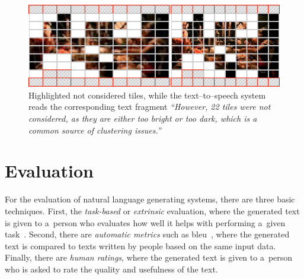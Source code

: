 \documentclass{article}
\begin{document}
\begin{figure}[t!]
  \centering
  \includegraphics[width=0.75\linewidth]{./tile-highlight.png}
  \caption{Highlighted not considered tiles, while the text--to--speech system reads the corresponding text fragment \textit{``However, 22 tiles were not considered, as they are either too bright or too dark, which is a common source of clustering issues.''}}
  \label{fig:tile-highlight}
\end{figure}


\vspace{-0.5cm}
\section{Evaluation}
\label{sec:evaluation}
For the evaluation of natural language generating systems, there are three basic techniques. First, the \emph{task-based} or \emph{extrinsic} evaluation,
where the generated text is given to a~person who evaluates how well it helps with performing a~given task~\cite{portet2009nlg}. Second, there are \emph{automatic metrics} such as {\sc bleu}~\cite{papineni2002bleu}, where the generated text is compared to texts written by people based on the same input data. Finally, there are \emph{human ratings}, where the generated text is given to a~person who is asked to rate the quality and usefulness of the text.
\end{document}
